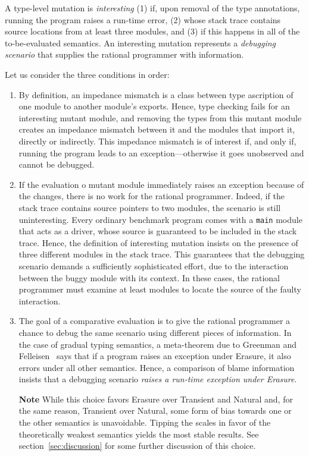 
A type-level mutation is {\em interesting\/} (1) if, upon removal of the type
annotations, running the program raises a run-time error, (2) whose stack trace
contains source locations from at least three modules, and (3) if this happens
in all of the to-be-evaluated semantics. An interesting mutation represents a
{\em debugging scenario\/} that supplies the rational programmer with
information.

Let us consider the three conditions in order:
\begin{enumerate}

\item By definition, an impedance mismatch is a class between type ascription of
one module to another module's exports. Hence, type checking fails for an
interesting mutant module, and removing the types from this mutant module
creates an impedance mismatch between it and the modules that import it,
directly or indirectly. This impedance mismatch is of interest if, and only if,
running the program leads to an exception---otherwise it goes unobserved and
cannot be debugged.

\item If the evaluation o mutant module immediately raises an exception because
of the changes, there is no work for the rational programmer. Indeed, if the
stack trace contains source pointers to two modules, the scenario is still
uninteresting. Every ordinary benchmark program comes with a {\tt main} module
that acts as a driver, whose source is guaranteed to be included in the stack
trace.  Hence, the definition of interesting mutation insists on the presence of
three different modules in the stack trace. This guarantees that the debugging
scenario demands a sufficiently sophisticated effort, due to the interaction
between the buggy module with its context.  In these cases, the rational
programmer must examine at least modules to locate the source of the faulty
interaction.

\item The goal of a comparative evaluation is to give the rational programmer a
chance to debug the same scenario using different pieces of information.  In the
case of gradual typing semantics, a meta-theorem due to Greenman and
Felleisen~\cite{gf-icfp-2018} says that if a program raises an exception under
Erasure, it also errors under all other semantics.  Hence, a comparison of blame
information insists that a debugging scenario {\em raises a run-time exception
under Erasure\/}.

{\bf Note} While this choice favors Erasure over Transient and Natural and, for
the same reason, Transient over Natural, some form of bias towards one or the
other semantics is unavoidable. Tipping the scales in favor of the theoretically
weakest semantics yields the most stable results. See
section~\ref{sec:discussion} for some further discussion of this choice.

\end{enumerate}

